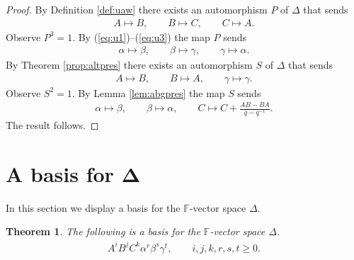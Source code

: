 \documentclass[11pt]{article}
\numberwithin{equation}{section}
\newtheorem{Theorem}{Theorem}[section]
\begin{document}
\begin{proof}
By Def\/inition
\ref{def:uaw} there exists an automorphism
$P$ of $\Delta $ that sends
\begin{gather*}
A \mapsto B,
\qquad
B \mapsto C,
\qquad
C \mapsto A.
\end{gather*}
Observe $P^3=1$. By
(\ref{eq:u1})--(\ref{eq:u3})
the map $P$ sends
\begin{gather*}
\alpha \mapsto \beta,
\qquad
\beta \mapsto \gamma,
\qquad
\gamma \mapsto \alpha.
\end{gather*}
By Theorem
\ref{prop:altpres} there exists
an automorphism
$S$ of $\Delta $ that sends
\begin{gather*}
A \mapsto B,
 \qquad
B \mapsto A,
\qquad
\gamma \mapsto \gamma.
\end{gather*}
Observe $S^2=1$. By
Lemma
\ref{lem:abgpres}
the map $S$
sends
\begin{gather*}
\alpha \mapsto \beta,
\qquad
\beta \mapsto \alpha,
\qquad
C \mapsto C + \frac{AB-BA}{q-q^{-1}}.
\end{gather*}
The result follows.
\end{proof}
\setcounter{section}{3}
\setcounter{subsection}{0}
\setcounter{subsubsection}{0}
\setcounter{Theorem}{13}
\setcounter{equation}{4}
\section[A basis for $\Delta $]{A basis for $\boldsymbol{\Delta}$}

 In this section we display a basis for the $\mathbb F$-vector
space $\Delta $.

\begin{Theorem}
\label{thm:basis}
The following is a basis for the $\mathbb F$-vector
space $ \Delta $.
\begin{gather}
\label{eq:basis}
A^iB^jC^k \alpha^r\beta^s\gamma^t, \qquad   i,j,k,r,s,t \geq 0.
\end{gather}
\end{Theorem}
\end{document}
